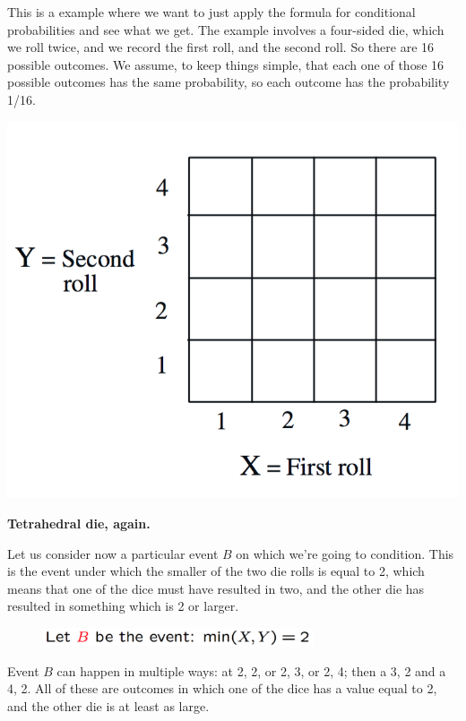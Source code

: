 \documentclass{tufte-handout}
\begin{document}
 This is a example where we want to just apply the formula for conditional probabilities and see
what we get. The example involves a four-sided die, which we roll
twice, and we record the first roll, and the second roll. So there are 16 possible outcomes. 
We assume, to keep things simple, that each one of those 16 possible outcomes has
the same probability, so each outcome has the probability 1/16. 

\begin{marginfigure}
  \includegraphics{TetraDie}
  \caption{\textbf{Tetrahedral die, again.}}
\end{marginfigure}
Let us consider now a particular event
$B$ on which we're going to condition. This is the event under which the smaller of the two die rolls is
equal to 2, which means that one of the dice must have resulted in two, and the other die has resulted
in something which is 2 or larger.

\begin{figure}
  \includegraphics[width=8cm]{MinFormula}
\end{figure}

Event $B$ can happen in multiple ways: at 2, 2, or
2, 3, or 2, 4; then a 3, 2 and a 4, 2. All of these are outcomes in which one of the dice has a value equal
to 2, and the other die is at least as large.
\end{document}
